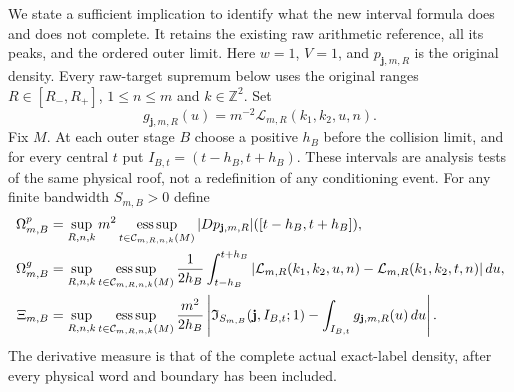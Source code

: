 We state a sufficient implication to identify what the new interval
formula does and does not complete.  It retains the existing raw
arithmetic reference, all its peaks, and the ordered outer limit.
Here $w=1$, $V=1$, and $p_{\mathbf j,m,R}$ is the original density.
Every raw-target supremum below uses the original ranges
$R\in[R_-,R_+]$, $1\le n\le m$ and $k\in\mathbb Z^2$.
Set
\[
 g_{\mathbf j,m,R}(u)=m^{-2}\mathcal L_{m,R}(k_1,k_2,u,n).
\]
Fix $M$.  At each outer stage $B$ choose a positive $h_B$ before
the collision limit, and for every central $t$ put
$I_{B,t}=(t-h_B,t+h_B)$.  These intervals are analysis tests of the
same physical roof, not a redefinition of any conditioning event.
For any finite bandwidth $S_{m,B}>0$ define
\begin{align*}
 \Omega_{m,B}^{p}
   &=\sup_{R,n,k}m^2\operatorname*{ess\,sup}_{t\in\mathcal C_{m,R,n,k}(M)}
                       |Dp_{\mathbf j,m,R}|([t-h_B,t+h_B]),\\
 \Omega_{m,B}^{g}
   &=\sup_{R,n,k}\operatorname*{ess\,sup}_{t\in\mathcal C_{m,R,n,k}(M)}
      {1\over2h_B}\int_{t-h_B}^{t+h_B}
       |\mathcal L_{m,R}(k_1,k_2,u,n)
                  -\mathcal L_{m,R}(k_1,k_2,t,n)|\,du,\\
 \Xi_{m,B}
   &=\sup_{R,n,k}\operatorname*{ess\,sup}_{t\in\mathcal C_{m,R,n,k}(M)}
      {m^2\over2h_B}
      \left|\mathfrak I_{S_{m,B}}(\mathbf j,I_{B,t};1)
                          -\int_{I_{B,t}}g_{\mathbf j,m,R}(u)\,du\right|.
\end{align*}
The derivative measure is that of the complete actual exact-label
density, after every physical word and boundary has been included.

